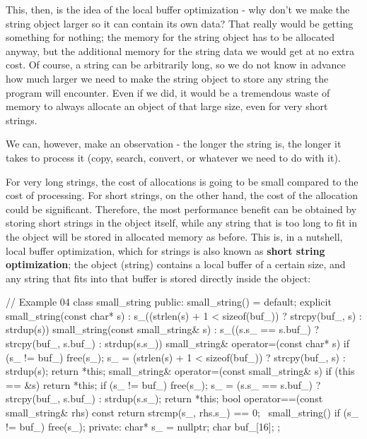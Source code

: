 This, then, is the idea of the local buffer optimization - why don't we make the string object larger so it can contain its own data? That really would be getting something for nothing; the memory for the string object has to be allocated anyway, but the additional memory for the string data we would get at no extra cost. Of course, a string can be arbitrarily long, so we do not know in advance how much larger we need to make the string object to store any string the program will encounter. Even if we did, it would be a tremendous waste of memory to always allocate an object of that large size, even for very short strings.

We can, however, make an observation - the longer the string is, the longer it takes to process it (copy, search, convert, or whatever we need to do with it).

For very long strings, the cost of allocations is going to be small compared to the cost of processing. For short strings, on the other hand, the cost of the allocation could be significant. Therefore, the most performance benefit can be obtained by storing short strings in the object itself, while any string that is too long to fit in the object will be stored in allocated memory as before. This is, in a nutshell, local buffer optimization, which for strings is also known as \textbf{short string optimization}; the object (string) contains a local buffer of a certain size, and any string that fits into that buffer is stored directly inside the object:

\begin{code}
// Example 04
class small_string {
  public:
  small_string() = default;
  explicit small_string(const char* s) :
    s_((strlen(s) + 1 < sizeof(buf_)) ? strcpy(buf_, s)
                                      : strdup(s)) {}
  small_string(const small_string& s) :
    s_((s.s_ == s.buf_) ? strcpy(buf_, s.buf_)
                        : strdup(s.s_)) {}
  small_string& operator=(const char* s) {
    if (s_ != buf_) free(s_);
    s_ = (strlen(s) + 1 < sizeof(buf_)) ? strcpy(buf_, s)
                                        : strdup(s);
    return *this;
  }
  small_string& operator=(const small_string& s) {
    if (this == &s) return *this;
    if (s_ != buf_) free(s_);
    s_ = (s.s_ == s.buf_) ? strcpy(buf_, s.buf_)
                          : strdup(s.s_);
    return *this;
  }
  bool operator==(const small_string& rhs) const {
    return strcmp(s_, rhs.s_) == 0;
  }
  ~small_string() {
    if (s_ != buf_) free(s_);
  }
  private:
  char* s_ = nullptr;
  char buf_[16];
};
\end{code}

